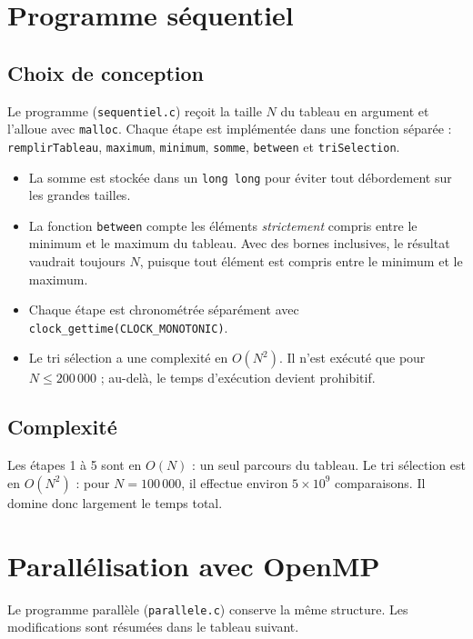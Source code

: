 \documentclass[11pt,a4paper]{article}
\begin{document}
\section{Programme séquentiel}

\subsection{Choix de conception}

Le programme (\texttt{sequentiel.c}) reçoit la taille $N$ du tableau en argument et l'alloue avec \texttt{malloc}. Chaque étape est implémentée dans une fonction séparée : \texttt{remplirTableau}, \texttt{maximum}, \texttt{minimum}, \texttt{somme}, \texttt{between} et \texttt{triSelection}.

\begin{itemize}
  \item La somme est stockée dans un \texttt{long long} pour éviter tout débordement sur les grandes tailles.
  \item La fonction \texttt{between} compte les éléments \emph{strictement} compris entre le minimum et le maximum du tableau. Avec des bornes inclusives, le résultat vaudrait toujours $N$, puisque tout élément est compris entre le minimum et le maximum.
  \item Chaque étape est chronométrée séparément avec \texttt{clock\_gettime(CLOCK\_MONOTONIC)}.
  \item Le tri sélection a une complexité en $O(N^2)$. Il n'est exécuté que pour $N \leq 200\,000$ ; au-delà, le temps d'exécution devient prohibitif.
\end{itemize}

\subsection{Complexité}

Les étapes 1 à 5 sont en $O(N)$ : un seul parcours du tableau. Le tri sélection est en $O(N^2)$ : pour $N = 100\,000$, il effectue environ $5 \times 10^9$ comparaisons. Il domine donc largement le temps total.

\section{Parallélisation avec OpenMP}

Le programme parallèle (\texttt{parallele.c}) conserve la même structure. Les modifications sont résumées dans le tableau suivant.
\end{document}
